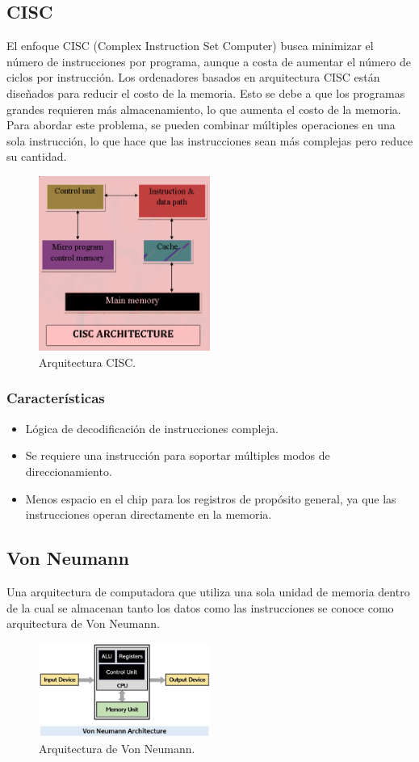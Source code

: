 \documentclass[12pt]{report}
\begin{document}
\subsection{CISC}
El enfoque CISC (Complex Instruction Set Computer) busca minimizar el número de instrucciones por programa, aunque a costa de aumentar el número de ciclos por instrucción. Los ordenadores basados en arquitectura CISC están diseñados para reducir el costo de la memoria. Esto se debe a que los programas grandes requieren más almacenamiento, lo que aumenta el costo de la memoria. Para abordar este problema, se pueden combinar múltiples operaciones en una sola instrucción, lo que hace que las instrucciones sean más complejas pero reduce su cantidad.\cite{1}
\begin{figure}[H]
  \centering
  \includegraphics[width=0.5\textwidth]{CISC.png}
  \caption{Arquitectura CISC.}
  \label{fig:cisc}
\end{figure}
\subsubsection{Características}
\begin{itemize}
  \item Lógica de decodificación de instrucciones compleja.
  \item Se requiere una instrucción para soportar múltiples modos de direccionamiento.
  \item Menos espacio en el chip para los registros de propósito general, ya que las instrucciones operan directamente en la memoria.
\end{itemize}

\subsection{Von Neumann}
Una arquitectura de computadora que utiliza una sola unidad de memoria dentro de la cual se almacenan tanto los datos como las instrucciones se conoce como arquitectura de Von Neumann.\cite{4}
\begin{figure}[H]
  \centering
  \includegraphics[width=0.5\textwidth]{VonNeuman.png}
  \caption{Arquitectura de Von Neumann.}
  \label{fig:von}
\end{figure}
\end{document}
